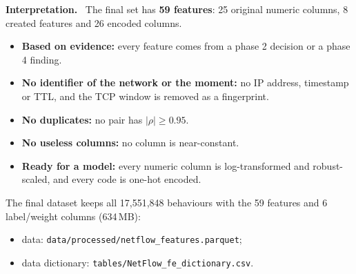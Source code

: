 \documentclass[11pt,a4paper]{article}
\newenvironment{reading}{\par\smallskip\noindent\textbf{\color{navy}Interpretation.}\ }{\par\medskip}
\begin{document}
\begin{reading}
The final set has \textbf{59 features}: 25 original numeric columns, 8 created features and 26 encoded columns.
\begin{itemize}
  \item \textbf{Based on evidence:} every feature comes from a phase 2 decision or a phase 4 finding.
  \item \textbf{No identifier of the network or the moment:} no IP address, timestamp or TTL, and the TCP window is
        removed as a fingerprint.
  \item \textbf{No duplicates:} no pair has $|\rho| \geq 0.95$.
  \item \textbf{No useless columns:} no column is near-constant.
  \item \textbf{Ready for a model:} every numeric column is log-transformed and robust-scaled, and every code is one-hot
        encoded.
\end{itemize}
The final dataset keeps all 17,551,848 behaviours with the 59 features and 6 label/weight columns (634\,MB):
\begin{itemize}
  \item data: \texttt{data/processed/netflow\_features.parquet};
  \item data dictionary: \texttt{tables/NetFlow\_fe\_dictionary.csv}.
\end{itemize}
\end{reading}
\end{document}
